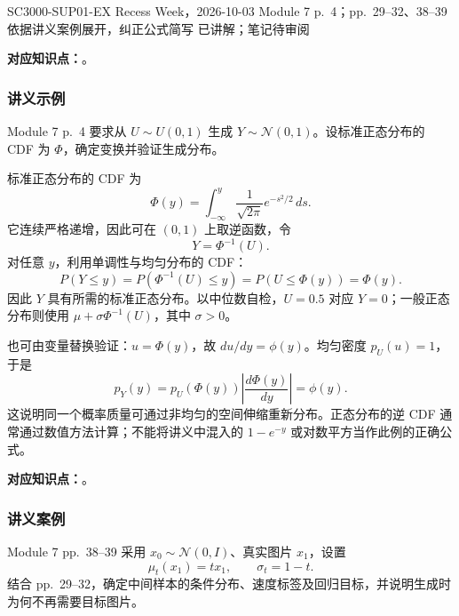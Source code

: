 
\examplemeta
  {SC3000-SUP01-EX}
  {Recess Week，2026-10-03}
  {Module 7 p.~4；pp.~29--32、38--39}
  {依据讲义案例展开，纠正公式简写}
  {已讲解；笔记待审阅}


\textbf{对应知识点：}。

\subsubsection*{讲义示例}

Module 7 p.~4 要求从 $U\sim U(0,1)$ 生成 $Y\sim\mathcal N(0,1)$。设标准正态分布的 CDF 为 $\Phi$，确定变换并验证生成分布。

\begin{workedsolution}
标准正态分布的 CDF 为
\[
  \Phi(y)=\int_{-\infty}^{y}\frac{1}{\sqrt{2\pi}}e^{-s^2/2}\,ds.
\]
它连续严格递增，因此可在 $(0,1)$ 上取逆函数，令
\[
  \boxed{Y=\Phi^{-1}(U)}.
\]
对任意 $y$，利用单调性与均匀分布的 CDF：
\[
  P(Y\le y)=P(\Phi^{-1}(U)\le y)
    =P(U\le\Phi(y))=\Phi(y).
\]
因此 $Y$ 具有所需的标准正态分布。以中位数自检，$U=0.5$ 对应 $Y=0$；一般正态分布则使用 $\mu+\sigma\Phi^{-1}(U)$，其中 $\sigma>0$。

也可由变量替换验证：$u=\Phi(y)$，故 $du/dy=\phi(y)$。均匀密度 $p_U(u)=1$，于是
\[
  p_Y(y)=p_U(\Phi(y))\left|\frac{d\Phi(y)}{dy}\right|=\phi(y).
\]
这说明同一个概率质量可通过非均匀的空间伸缩重新分布。正态分布的逆 CDF 通常通过数值方法计算；不能将讲义中混入的 $1-e^{-y}$ 或对数平方当作此例的正确公式。
\end{workedsolution}


\textbf{对应知识点：}。

\subsubsection*{讲义案例}

Module 7 pp.~38--39 采用 $x_0\sim\mathcal N(0,I)$、真实图片 $x_1$，设置
\[
  \mu_t(x_1)=t x_1,\qquad\sigma_t=1-t.
\]
结合 pp.~29--32，确定中间样本的条件分布、速度标签及回归目标，并说明生成时为何不再需要目标图片。

